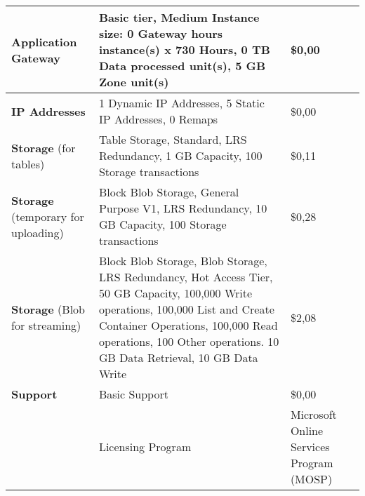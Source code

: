 \begin{adjustbox}{angle=90}
\begin{tabularx}{\textheight}{|l||X|m{4cm}|}
                \textbf{Application Gateway}      & Basic tier, Medium Instance size: 0 Gateway hours instance(s) x 730 Hours, 0 TB Data processed unit(s), 5 GB Zone unit(s)                                                                    & \$0,00                                   \\ \hline
                \textbf{IP Addresses}             & 1 Dynamic IP Addresses, 5 Static IP Addresses, 0 Remaps                                                                                                                                      & \$0,00                                   \\ \hline
                \textbf{Storage} (for tables)                  & Table Storage, Standard, LRS Redundancy, 1 GB Capacity, 100 Storage transactions                                                                                                             & \$0,11                                   \\ \hline
                \textbf{Storage} (temporary for uploading)                     & Block Blob Storage, General Purpose V1, LRS Redundancy, 10 GB Capacity, 100 Storage transactions                                                                                                                                                 & \$0,28                                   \\ \hline
\textbf{Storage} (Blob for streaming)                           & Block Blob Storage, Blob Storage, LRS Redundancy, Hot Access Tier, 50 GB Capacity, 100,000 Write operations, 100,000 List and Create Container Operations, 100,000 Read operations, 100 Other operations. 10 GB Data Retrieval, 10 GB Data Write & \$2,08                                   \\ \hline
\textbf{Support}                                  & Basic Support                                                                                                                                                                                                                                          & \$0,00                                   \\ \hline
                                                        & Licensing Program                                                                                                                                                                                                                                & Microsoft Online Services Program (MOSP) \\ \hline

\end{tabularx}
\end{adjustbox}
